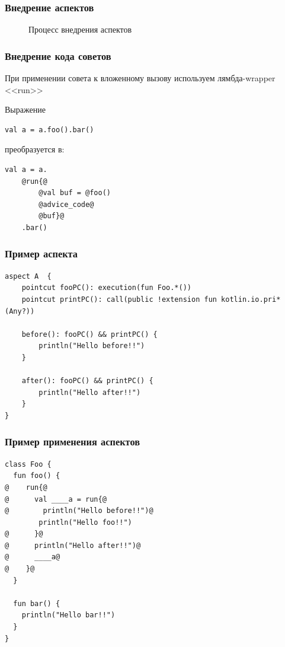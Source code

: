 \documentclass[hyperref={pdftex,unicode}]{beamer}
\begin{document}
\begin{frame}[fragile=singleslide]
	\frametitle{Внедрение аспектов}
	\begin{figure}[h]
		\caption{Процесс внедрения аспектов}
		\label{ris:aspect_weaving}
	\end{figure}
\end{frame}


\begin{frame}[fragile=singleslide]
	\frametitle{Внедрение кода советов}
	При применении совета к вложенному вызову используем лямбда-wrapper <<run>>

	Выражение
	\begin{lstlisting}[frame=single,style=base]
val a = a.foo().bar()
	\end{lstlisting}
	преобразуется в:
	\begin{lstlisting}[frame=single,style=base]
val a = a.
	@run{@
		@val buf = @foo()
		@advice_code@
		@buf}@
	.bar()
	\end{lstlisting}
\end{frame}

\begin{frame}[fragile=singleslide]
	\frametitle{Пример аспекта}
	\begin{lstlisting}[frame=single,style=base]
aspect A  {
    pointcut fooPC(): execution(fun Foo.*())
    pointcut printPC(): call(public !extension fun kotlin.io.pri*(Any?))

    before(): fooPC() && printPC() {
        println("Hello before!!")
    }

    after(): fooPC() && printPC() {
        println("Hello after!!")
    }
}
	\end{lstlisting}
\end{frame}


\begin{frame}[fragile=singleslide]
	\frametitle{Пример применения аспектов}
	\begin{lstlisting}[frame=single,style=base]
class Foo {
  fun foo() {
@    run{@
@      val ____a = run{@
@        println("Hello before!!")@
        println("Hello foo!!")
@      }@
@      println("Hello after!!")@
@      ____a@
@    }@
  }

  fun bar() {
  	println("Hello bar!!")
  }
}
	\end{lstlisting}
\end{frame}
\end{document}
